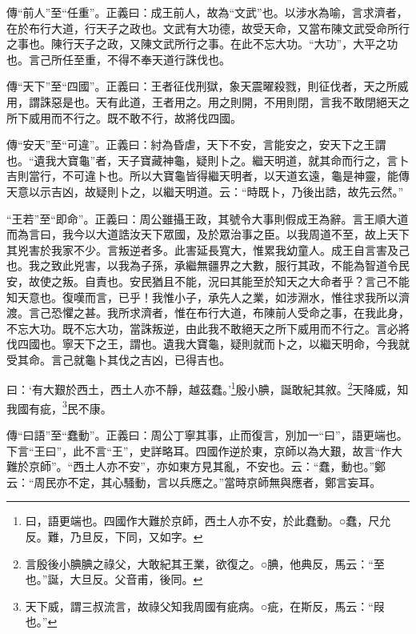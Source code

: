 {\noindent\zhuan{}\fzbyks 傳“前人”至“任重”。正義曰：成王前人，故為“文武”也。以涉水為喻，言求濟者，在於布行大道，行天子之政也。文武有大功德，故受天命，又當布陳文武受命所行之事也。陳行天子之政，又陳文武所行之事。在此不忘大功。“大功”，大平之功也。言己所任至重，不得不奉天道行誅伐也。 \par}

{\noindent\zhuan{}\fzbyks 傳“天下”至“四國”。正義曰：王者征伐刑獄，象天震曜殺戮，則征伐者，天之所威用，謂誅惡是也。天有此道，王者用之。用之則開，不用則閉，言我不敢閉絕天之所下威用而不行之。既不敢不行，故將伐四國。 \par}

{\noindent\zhuan{}\fzbyks 傳“安天”至“可違”。正義曰：紂為昏虐，天下不安，言能安之，安天下之王謂也。“遺我大寶龜”者，天子寶藏神龜，疑則卜之。繼天明道，就其命而行之，言卜吉則當行，不可違卜也。所以大寶龜皆得繼天明者，以天道玄遠，龜是神靈，能傳天意以示吉凶，故疑則卜之，以繼天明道。云：“時既卜，乃後出誥，故先云然。” \par}

{\noindent\shu{}\fzkt “王若”至“即命”。正義曰：周公雖攝王政，其號令大事則假成王為辭。言王順大道而為言曰，我今以大道誥汝天下眾國，及於眾治事之臣。以我周道不至，故上天下其兇害於我家不少。言叛逆者多。此害延長寬大，惟累我幼童人。成王自言害及己也。我之致此兇害，以我為子孫，承繼無疆界之大數，服行其政，不能為智道令民安，故使之叛。自責也。安民猶且不能，況曰其能至於知天之大命者乎？言己不能知天意也。復嘆而言，已乎！我惟小子，承先人之業，如涉淵水，惟往求我所以濟渡。言己恐懼之甚。我所求濟者，惟在布行大道，布陳前人受命之事，在我此身，不忘大功。既不忘大功，當誅叛逆，由此我不敢絕天之所下威用而不行之。言必將伐四國也。寧天下之王，謂也。遺我大寶龜，疑則就而卜之，以繼天明命，今我就受其命。言己就龜卜其伐之吉凶，已得吉也。 \par}

曰：‘有大艱於西土，西土人亦不靜，越茲蠢。’\footnote{曰，語更端也。四國作大難於京師，西土人亦不安，於此蠢動。○蠢，尺允反。難，乃旦反，下同，又如字。}殷小腆，誕敢紀其敘。\footnote{言殷後小腆腆之祿父，大敢紀其王業，欲復之。○腆，他典反，馬云：“至也。”誕，大旦反。父音甫，後同。}天降威，知我國有疵，\footnote{天下威，謂三叔流言，故祿父知我周國有疵病。○疵，在斯反，馬云：“叚也。”}民不康。


{\noindent\zhuan{}\fzbyks 傳“曰語”至“蠢動”。正義曰：周公丁寧其事，止而復言，別加一“曰”，語更端也。下言“王曰”，此不言“王”，史詳略耳。四國作逆於東，京師以為大艱，故言“作大難於京師”。“西土人亦不安”，亦如東方見其亂，不安也。云：“蠢，動也。”鄭云：“周民亦不定，其心騷動，言以兵應之。”當時京師無與應者，鄭言妄耳。 \par}

